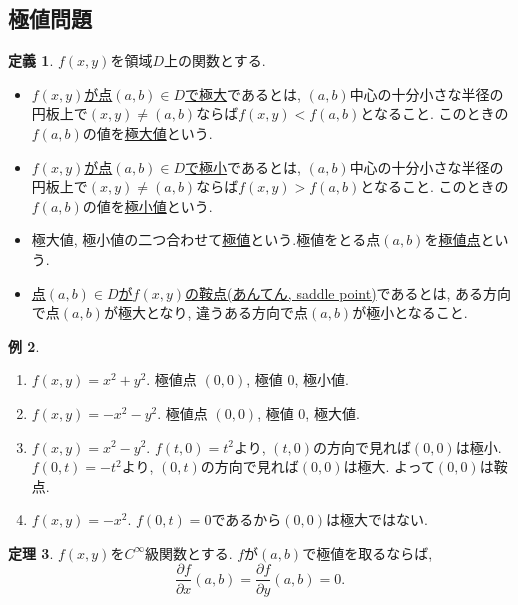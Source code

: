 \documentclass[dvipdfmx,a4paper,11pt]{article}
\theoremstyle{definition}
\newtheorem{thm}{定理}
\newtheorem{dfn}[thm]{定義}
\newtheorem{exa}[thm]{例}
\newcommand{\pdrv}[2]{\frac{\partial #1}{\partial #2}}
\begin{document}
 \subsection{極値問題}
\begin{tcolorbox}[
    colback = white,
    colframe = green!35!black,
    fonttitle = \bfseries,
    breakable = true]
    \begin{dfn}
    $f(x,y)$を領域$D$上の関数とする.
\begin{itemize}
  \setlength{\parskip}{0cm} 
  \setlength{\itemsep}{0cm}
\item \underline{$f(x,y)$が点$(a,b)\in D$で極大}であるとは, $(a,b)$中心の十分小さな半径の円板上で$(x,y) \neq (a,b)$ならば$f(x,y) < f(a,b)$となること.
このときの$f(a,b)$の値を\underline{極大値}という.
\item \underline{$f(x,y)$が点$(a,b)\in D$で極小}であるとは, $(a,b)$中心の十分小さな半径の円板上で$(x,y) \neq (a,b)$ならば$f(x,y) > f(a,b)$となること.
このときの$f(a,b)$の値を\underline{極小値}という.
\item  極大値, 極小値の二つ合わせて\underline{極値}という.極値をとる点$(a,b)$を\underline{極値点}という.
\item \underline{点$(a,b)\in D$が$f(x,y)$の鞍点(あんてん, saddle point)}であるとは, ある方向で点$(a,b)$が極大となり, 違うある方向で点$(a,b)$が極小となること.
\end{itemize}
    \end{dfn}
    \end{tcolorbox}
    
\begin{exa}
\begin{enumerate}
  \setlength{\parskip}{0cm} 
  \setlength{\itemsep}{0cm}
\item $f(x,y)=x^2 + y^2$. 極値点 $(0,0)$, 極値 0, 極小値.
\item $f(x,y)=-x^2 - y^2$. 極値点 $(0,0)$, 極値 0, 極大値.
\item $f(x,y)=x^2 -y^2$.
$f(t,0) = t^2$より, $(t,0)$の方向で見れば$(0,0)$は極小.
$f(0,t) = -t^2$より, $(0,t)$の方向で見れば$(0,0)$は極大.
よって$(0,0)$は鞍点.
\item $f(x,y)=-x^2 $. $f(0,t) =0$であるから$(0,0)$は極大ではない. 
\end{enumerate}

\end{exa}

    
\begin{tcolorbox}[
    colback = white,
    colframe = green!35!black,
    fonttitle = \bfseries,
    breakable = true]
    \begin{thm}
    $f(x,y)$を$C^{\infty}$級関数とする.
    $f$が$(a,b)$で極値を取るならば,
    $$
    \pdrv{f}{x}(a,b) = \pdrv{f}{y}(a,b) = 0.
    $$

    \end{thm}
    \end{tcolorbox}
\end{document}
